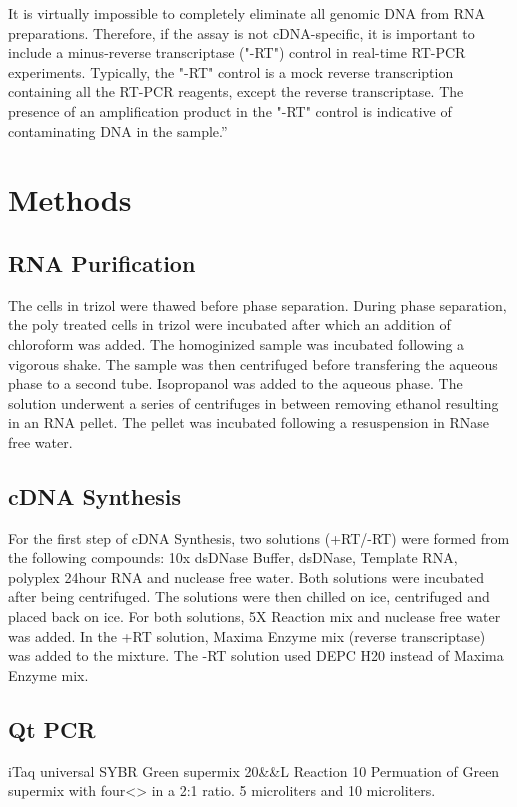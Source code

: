 \documentclass[journal, a4paper]{IEEEtran}
\begin{document}
It is virtually impossible to completely eliminate all genomic DNA from RNA preparations. Therefore, if the assay is not cDNA-specific, it is important to include a minus-reverse transcriptase ("-RT") control in real-time RT-PCR experiments. Typically, the "-RT" control is a mock reverse transcription containing all the RT-PCR reagents, except the reverse transcriptase. The presence of an amplification product in the "-RT" control is indicative of contaminating DNA in the sample.”

\section{Methods}
    \subsection{RNA Purification}
      The cells in trizol were thawed before phase separation. During phase separation,
      the poly treated cells in trizol were incubated after which an addition of chloroform was added.
      The homoginized sample was incubated following a vigorous shake. The sample was then centrifuged before transfering the aqueous phase
      to a second tube. Isopropanol was added to the aqueous phase. The solution underwent a series of centrifuges in between removing ethanol
      resulting in an RNA pellet. The pellet was incubated following a resuspension in RNase free water.

    \subsection{cDNA Synthesis}
      For the first step of cDNA Synthesis, two solutions (+RT/-RT) were formed from the following compounds:
      10x dsDNase Buffer, dsDNase, Template RNA, polyplex 24hour RNA and nuclease free water.
      Both solutions were incubated after being centrifuged. The solutions were then chilled on ice, centrifuged and placed back on ice.
      For both solutions, 5X Reaction mix and nuclease free water was added. In the +RT solution, Maxima Enzyme mix (reverse transcriptase) was added to the mixture.
      The -RT solution used DEPC H20 instead of Maxima Enzyme mix.

    \subsection{Qt PCR}

      iTaq universal SYBR Green supermix 20&\mu&L Reaction
      10
      Permuation of Green supermix with four<> in a 2:1 ratio.
      5 microliters and 10 microliters.
\end{document}
